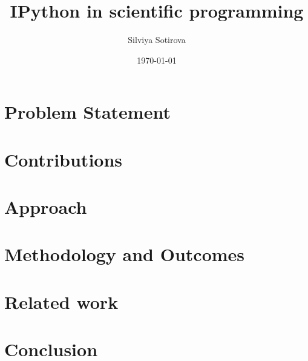 \documentclass{article}
\title{IPython in scientific programming}
\author{Silviya Sotirova}
\date{\today}
\begin{document}
\maketitle

%
%
\abstract{}


\section{Problem Statement}



\section{Contributions}



\section{Approach}
\label{approach}

\subsection{} 
\label{syntax}



\subsection{}
\label{performance}



\subsection{} 
\label{SciPy}


\section{Methodology and Outcomes}
  

\section{Related work}
\section{Conclusion}






\end{document}
